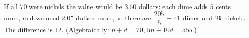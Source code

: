 If all $70$ were nickels the value would be $3.50$ dollars; each dime adds $5$ cents more, and we need $2.05$ dollars more, so there are $\dfrac{205}{5}=41$ dimes and $29$ nickels. The difference is $\boxed{12}$. (Algebraically: $n+d=70$, $5n+10d=555$.)
